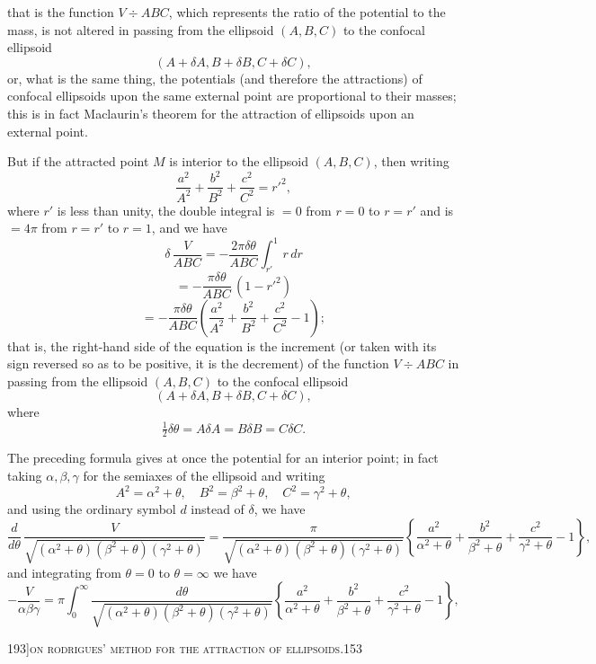 \documentclass[11pt]{article}
\begin{document}
\medskip

\noindent that is the function $V \div ABC$, which represents the ratio of the potential to the mass, is not altered in passing from the ellipsoid $(A, B, C)$ to the confocal ellipsoid
\[
(A + \delta A, B + \delta B, C + \delta C),
\]
or, what is the same thing, the potentials (and therefore the attractions) of confocal ellipsoids upon the same external point are proportional to their masses; this is in fact Maclaurin's theorem for the attraction of ellipsoids upon an external point.

But if the attracted point $M$ is interior to the ellipsoid $(A, B, C)$, then writing
\[
\frac{a^{2}}{A^{2}} + \frac{b^{2}}{B^{2}} + \frac{c^{2}}{C^{2}} = r'^{2},
\]
where $r'$ is less than unity, the double integral is $= 0$ from $r = 0$ to $r = r'$ and is $= 4\pi$ from $r = r'$ to $r = 1$, and we have
\[
\delta\, \frac{V}{ABC} = -\frac{2\pi\delta\theta}{ABC}\int_{r'}^{1} r\, dr
\]
\[
= -\frac{\pi\delta\theta}{ABC}\, (1 - r'^{2})
\]
\[
= -\frac{\pi\delta\theta}{ABC}\left(\frac{a^{2}}{A^{2}} + \frac{b^{2}}{B^{2}} + \frac{c^{2}}{C^{2}} - 1\right);
\]
that is, the right-hand side of the equation is the increment (or taken with its sign reversed so as to be positive, it is the decrement) of the function $V \div ABC$ in passing from the ellipsoid $(A, B, C)$ to the confocal ellipsoid
\[
(A + \delta A, B + \delta B, C + \delta C),
\]
where
\[
\tfrac{1}{2}\delta\theta = A\delta A = B\delta B = C\delta C.
\]

The preceding formula gives at once the potential for an interior point; in fact taking $\alpha, \beta, \gamma$ for the semiaxes of the ellipsoid and writing
\[
A^{2} = \alpha^{2} + \theta,\quad B^{2} = \beta^{2} + \theta,\quad C^{2} = \gamma^{2} + \theta,
\]
and using the ordinary symbol $d$ instead of $\delta$, we have
\[
\frac{d}{d\theta}\, \frac{V}{\sqrt{(\alpha^{2} + \theta)(\beta^{2} + \theta)(\gamma^{2} + \theta)}} = \frac{\pi}{\sqrt{(\alpha^{2} + \theta)(\beta^{2} + \theta)(\gamma^{2} + \theta)}}\left\{\frac{a^{2}}{\alpha^{2} + \theta} + \frac{b^{2}}{\beta^{2} + \theta} + \frac{c^{2}}{\gamma^{2} + \theta} - 1\right\},
\]
and integrating from $\theta = 0$ to $\theta = \infty$ we have
\[
-\frac{V}{\alpha\beta\gamma} = \pi\int_{0}^{\infty} \frac{d\theta}{\sqrt{(\alpha^{2} + \theta)(\beta^{2} + \theta)(\gamma^{2} + \theta)}}\left\{\frac{a^{2}}{\alpha^{2} + \theta} + \frac{b^{2}}{\beta^{2} + \theta} + \frac{c^{2}}{\gamma^{2} + \theta} - 1\right\},
\]

\bigskip

\begin{center}\small 193]\hfill\textsc{on rodrigues' method for the attraction of ellipsoids.}\hfill 153\end{center}
\end{document}

